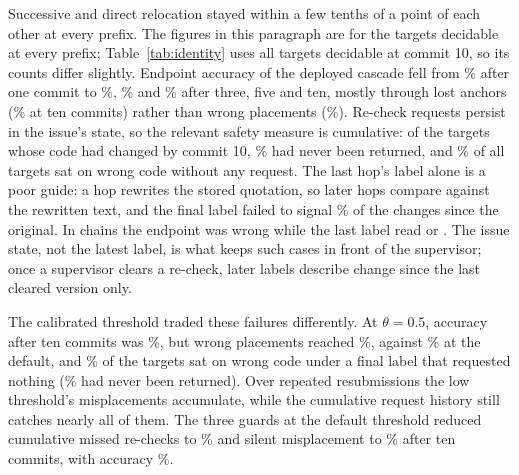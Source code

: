 Successive and direct relocation stayed within a few tenths of a point of each other at every prefix. The figures in this paragraph are for the \bTwoChainEvery{} targets decidable at every prefix; Table~\ref{tab:identity} uses all \bTwoDecidableTen{} targets decidable at commit 10, so its counts differ slightly. Endpoint accuracy of the deployed cascade fell from \bTwoSeqAccOne\% after one commit to \bTwoSeqAccThree\%, \bTwoSeqAccFive\% and \bTwoSeqAccTen\% after three, five and ten, mostly through lost anchors (\bTwoSeqLostTen\% at ten commits) rather than wrong placements (\bTwoSeqWrongTen\%). Re-check requests persist in the issue's state, so the relevant safety measure is cumulative: of the \bTwoChangedTen{} targets whose code had changed by commit 10, \bTwoSeqMissTen\% had never been returned, and \bTwoSeqSilentTen\% of all targets sat on wrong code without any request. The last hop's label alone is a poor guide: a  hop rewrites the stored quotation, so later hops compare against the rewritten text, and the final label failed to signal \bTwoSeqMissLastTen\% of the changes since the original. In \bTwoSeqLastExactWrongTen{} chains the endpoint was wrong while the last label read  or . The issue state, not the latest label, is what keeps such cases in front of the supervisor; once a supervisor clears a re-check, later labels describe change since the last cleared version only.

The calibrated threshold traded these failures differently. At $\theta=0.5$, accuracy after ten commits was \bTwoCalAccTen\%, but wrong placements reached \bTwoCalWrongTen\%, against \bTwoSeqWrongTen\% at the default, and \bTwoCalSilentLastTen\% of the targets sat on wrong code under a final label that requested nothing (\bTwoCalSilentTen\% had never been returned). Over repeated resubmissions the low threshold's misplacements accumulate, while the cumulative request history still catches nearly all of them. The three guards at the default threshold reduced cumulative missed re-checks to \bTwoSeqAllMissTen\% and silent misplacement to \bTwoSeqAllSilentTen\% after ten commits, with accuracy \bTwoSeqAllAccTen\%.



